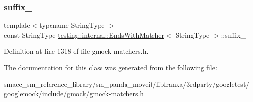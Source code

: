 \subsubsection{\texorpdfstring{suffix\+\_\+}{suffix\_}}
{\footnotesize\ttfamily template$<$typename String\+Type $>$ \\
const String\+Type \hyperlink{classtesting_1_1internal_1_1EndsWithMatcher}{testing\+::internal\+::\+Ends\+With\+Matcher}$<$ String\+Type $>$\+::suffix\+\_\+\hspace{0.3cm}{\ttfamily [private]}}



Definition at line 1318 of file gmock-\/matchers.\+h.



The documentation for this class was generated from the following file\+:\begin{DoxyCompactItemize}
\item 
smacc\+\_\+sm\+\_\+reference\+\_\+library/sm\+\_\+panda\+\_\+moveit/libfranka/3rdparty/googletest/googlemock/include/gmock/\hyperlink{gmock-matchers_8h}{gmock-\/matchers.\+h}\end{DoxyCompactItemize}
